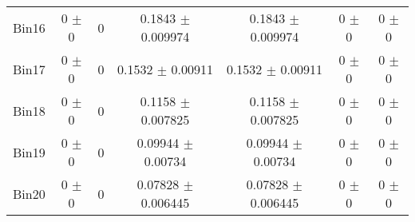 \begin{tabular}{@{\extracolsep{4pt}}lcccccc@{}}
     Bin16 & 0 $\pm$ 0 & 0 & 0.1843 $\pm$ 0.009974 & 0.1843 $\pm$ 0.009974 & 0 $\pm$ 0 & 0 $\pm$ 0 \\ 
     Bin17 & 0 $\pm$ 0 & 0 & 0.1532 $\pm$ 0.00911 & 0.1532 $\pm$ 0.00911 & 0 $\pm$ 0 & 0 $\pm$ 0 \\ 
     Bin18 & 0 $\pm$ 0 & 0 & 0.1158 $\pm$ 0.007825 & 0.1158 $\pm$ 0.007825 & 0 $\pm$ 0 & 0 $\pm$ 0 \\ 
     Bin19 & 0 $\pm$ 0 & 0 & 0.09944 $\pm$ 0.00734 & 0.09944 $\pm$ 0.00734 & 0 $\pm$ 0 & 0 $\pm$ 0 \\ 
     Bin20 & 0 $\pm$ 0 & 0 & 0.07828 $\pm$ 0.006445 & 0.07828 $\pm$ 0.006445 & 0 $\pm$ 0 & 0 $\pm$ 0 \\ 
\hline\hline
  \end{tabular}
